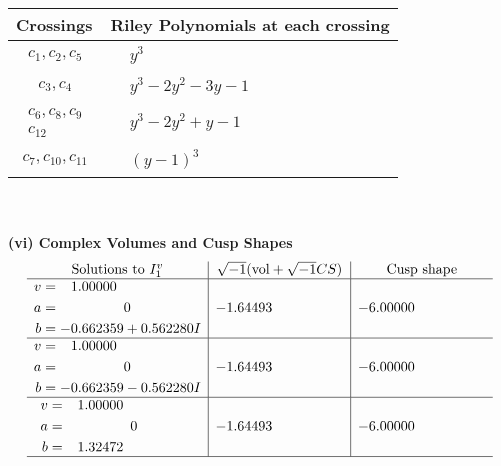 \documentclass[1p]{elsarticle_modified}
\theoremstyle{definition}
\newcommand{\I}{\sqrt{-1}}
\begin{document}
\begin{tabular}{m{50pt}|m{274pt}}
Crossings & \hspace{64pt}Riley Polynomials at each crossing \\
\hline $$\begin{aligned}c_{1},c_{2},c_{5}\end{aligned}$$&$\begin{aligned}
&y^3
\end{aligned}$\\
\hline $$\begin{aligned}c_{3},c_{4}\end{aligned}$$&$\begin{aligned}
&y^3-2 y^2-3 y-1
\end{aligned}$\\
\hline $$\begin{aligned}c_{6},c_{8},c_{9}\\c_{12}\end{aligned}$$&$\begin{aligned}
&y^3-2 y^2+y-1
\end{aligned}$\\
\hline $$\begin{aligned}c_{7},c_{10},c_{11}\end{aligned}$$&$\begin{aligned}
&(y-1)^3
\end{aligned}$\\
\hline
\end{tabular}\\~\\
\newpage\flushleft \textbf{(vi) Complex Volumes and Cusp Shapes}
$$\begin{array}{c|c|c}  
\text{Solutions to }I^v_{1}& \I (\text{vol} + \sqrt{-1}CS) & \text{Cusp shape}\\
 \hline 
\begin{aligned}
v &= \phantom{-}1.00000\phantom{ +0.000000I} \\
a &= \phantom{-0.000000 } 0 \\
b &= -0.662359 + 0.562280 I\end{aligned}
 & -1.64493\phantom{ +0.000000I} & -6.00000\phantom{ +0.000000I} \\ \hline\begin{aligned}
v &= \phantom{-}1.00000\phantom{ +0.000000I} \\
a &= \phantom{-0.000000 } 0 \\
b &= -0.662359 - 0.562280 I\end{aligned}
 & -1.64493\phantom{ +0.000000I} & -6.00000\phantom{ +0.000000I} \\ \hline\begin{aligned}
v &= \phantom{-}1.00000\phantom{ +0.000000I} \\
a &= \phantom{-0.000000 } 0 \\
b &= \phantom{-}1.32472\phantom{ +0.000000I}\end{aligned}
 & -1.64493\phantom{ +0.000000I} & -6.00000\phantom{ +0.000000I}\\
 \hline 
 \end{array}$$\newpage\newpage\renewcommand{\arraystretch}{1}
\end{document}
